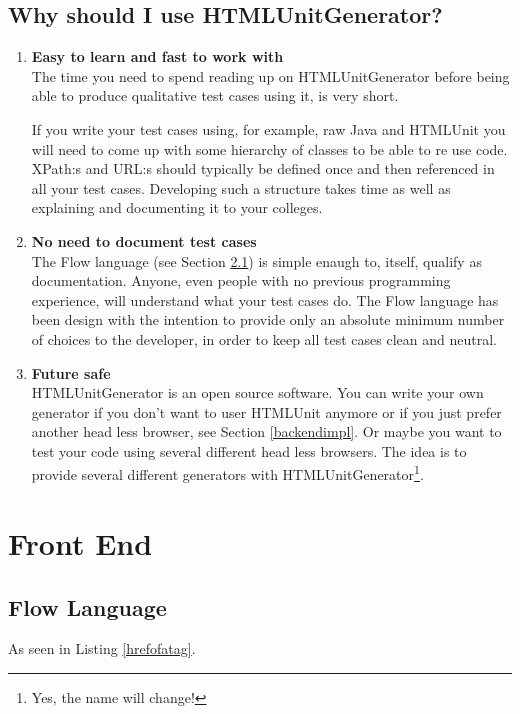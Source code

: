 \documentclass[a4paper,11pt]{kth-mag}
\begin{document}
\section{Why should I use HTMLUnitGenerator?}
\begin{enumerate}
\item \textbf{Easy to learn and fast to work with}\\
The time you need to spend reading up on HTMLUnitGenerator before being able to produce qualitative test cases using it, is very short.

If you write your test cases using, for example, raw Java and HTMLUnit you will need to come up with some hierarchy of classes to be able to re use code. XPath:s and URL:s should typically be defined once and then referenced in all your test cases. Developing such a structure takes time as well as explaining and documenting it to your colleges.

\item \textbf{No need to document test cases}\\
The Flow language (see Section \ref{flowlanguage}) is simple enaugh to, itself, qualify as documentation. Anyone, even people with no previous programming experience, will understand what your test cases do. The Flow language has been design with the intention to provide only an absolute minimum number of choices to the developer, in order to keep all test cases clean and neutral.

\item \textbf{Future safe}\\
HTMLUnitGenerator is an open source software. You can write your own generator if you don't want to user HTMLUnit anymore or if you just prefer another head less browser, see Section \ref{backendimpl}. Or maybe you want to test your code using several different head less browsers. The idea is to provide several different generators with HTMLUnitGenerator\footnote{Yes, the name will change!}.

\end{enumerate}

\chapter{Front End}
\label{frontend}

\section{Flow Language}
\label{flowlanguage}
\lstset{basicstyle=\footnotesize, caption=Find href of an a tag, label=hrefofatag, numbers=left, frame=single, captionpos=b}

As seen in Listing \ref{hrefofatag}.
\end{document}
